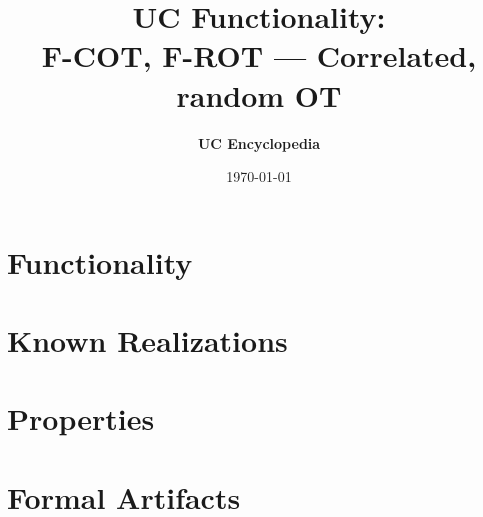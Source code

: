 \documentclass[11pt,a4paper]{article}
\title{\textbf{\Large UC Functionality:}\\[0.2em] \Large F-COT, F-ROT --- Correlated, random OT}
\author{\textbf{UC Encyclopedia}}
\date{\today}
\newtheorem{functionality}{Functionality}
\begin{document}
\maketitle

\begin{abstract}
\end{abstract}

\section{Functionality}

%

\section{Known Realizations}


\section{Properties}


\section{Formal Artifacts}

\end{document}
